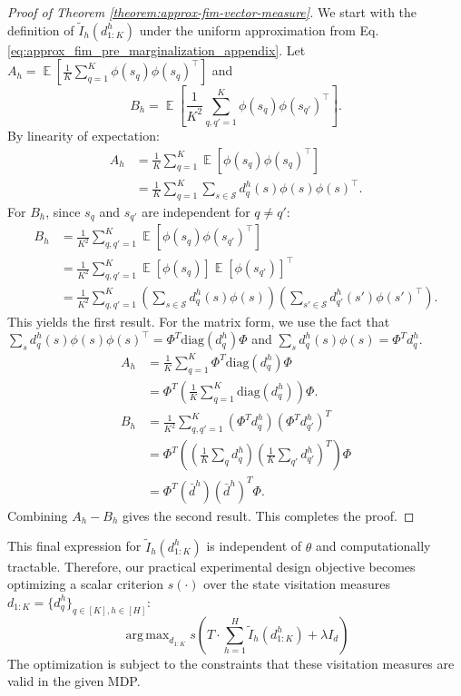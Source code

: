 \documentclass{article}
\DeclareMathOperator*{\E}{\mathbb{E}} %
\newcommand{\Scal}{\mathcal{S}}
\DeclareMathOperator*{\argmax}{arg\,max}
\begin{document}
\begin{proof}[Proof of Theorem \ref{theorem:approx-fim-vector-measure}]
We start with the definition of $\tilde{I}_h(d_{1:K}^h)$ under the uniform approximation from Eq. \ref{eq:approx_fim_pre_marginalization_appendix}.
Let $A_h = \E \left[ \frac{1}{K} \sum_{q=1}^K \phi(s_q)\phi(s_q)^\top \right]$ and
\[
B_h = \E \left[ \frac{1}{K^2} \sum_{q,q'=1}^K \phi(s_q)\phi(s_{q'})^\top \right].
\]
By linearity of expectation:
\begin{align*}
A_h
&= \frac{1}{K} \sum_{q=1}^K \E[\phi(s_q)\phi(s_q)^\top] \\
&= \frac{1}{K} \sum_{q=1}^K \sum_{s \in \Scal} d^h_q(s) \phi(s)\phi(s)^\top.
\end{align*}
For $B_h$, since $s_q$ and $s_{q'}$ are independent for $q \neq q'$:
\begin{align*}
B_h
&= \frac{1}{K^2} \sum_{q,q'=1}^K \E[\phi(s_q)\phi(s_{q'})^\top] \\
&= \frac{1}{K^2} \sum_{q,q'=1}^K \E[\phi(s_q)]\E[\phi(s_{q'})]^\top \\
&= \frac{1}{K^2} \sum_{q,q'=1}^K \left( \sum_{s \in \Scal} d^h_q(s) \phi(s) \right) \left( \sum_{s' \in \Scal} d^h_{q'}(s') \phi(s')^\top \right).
\end{align*}
This yields the first result. For the matrix form, we use the fact that $\sum_s d^h_q(s) \phi(s)\phi(s)^\top = \Phi^T \mathrm{diag}(d^h_q) \Phi$ and $\sum_s d^h_q(s) \phi(s) = \Phi^T d^h_q$.
\begin{align*}
A_h
&= \frac{1}{K} \sum_{q=1}^K \Phi^T \mathrm{diag}(d^h_q) \Phi \\
&= \Phi^T \left( \frac{1}{K} \sum_{q=1}^K \mathrm{diag}(d^h_q) \right) \Phi. \\
B_h
&= \frac{1}{K^2} \sum_{q,q'=1}^K (\Phi^T d^h_q)(\Phi^T d^h_{q'})^T \\
&= \Phi^T \left( \left(\frac{1}{K}\sum_q d^h_q\right) \left(\frac{1}{K}\sum_{q'} d^h_{q'}\right)^T \right) \Phi \\
&= \Phi^T (\bar{d}^h)(\bar{d}^h)^T \Phi.
\end{align*}
Combining $A_h - B_h$ gives the second result. This completes the proof.
\end{proof}

This final expression for $\tilde{I}_h(d_{1:K}^h)$ is independent of $\theta$ and computationally tractable. Therefore, our practical experimental design objective becomes optimizing a scalar criterion $s(\cdot)$ over the state visitation measures $d_{1:K} = \{d_q^h\}_{q \in [K], h \in [H]}$:
\begin{equation}
\argmax_{ d_{1:K} } s\left( T \cdot \sum_{h=1}^H \tilde{I}_h(d_{1:K}^h) + \lambda I_d \right) \label{eq:final_objective_appendix}
\end{equation}
The optimization is subject to the constraints that these visitation measures are valid in the given MDP.
\end{document}
